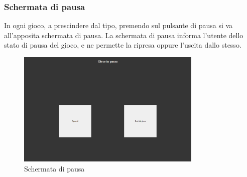 \subsubsection{Schermata di pausa}
In ogni gioco, a prescindere dal tipo, premendo sul pulsante di pausa si va all'apposita schermata di pausa.
La schermata di pausa informa l'utente dello stato di pausa del gioco, e ne permette la ripresa oppure l'uscita dallo stesso.
\begin{figure}[h]
    \centering
    \includegraphics[width=250pt]{images/product/schermataPausaGioco.png}
    \caption{Schermata di pausa}
    \label{fig:schermataPausaGioco}
\end{figure}
\newpage
